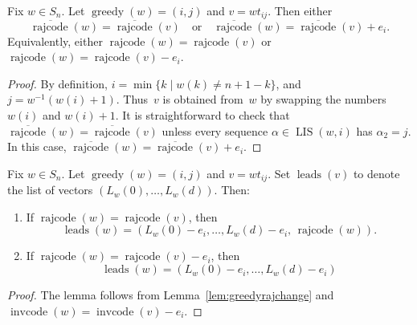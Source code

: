 \documentclass[ALCO]{cedram}
\DeclareMathOperator{\greedy}{\mathrm{greedy}}
\DeclareMathOperator{\leads}{\mathrm{leads}}
\DeclareMathOperator{\LIS}{\mathrm{LIS}}
\DeclareMathOperator{\cc}{\mathrm{invcode}}
\DeclareMathOperator{\rr}{\mathrm{rajcode}}
\newcommand{\orr}{\overline{\rr}}
\begin{document}
\begin{lemma}
	\label{lem:greedyrajchange}
	Fix $w\in S_n$. Let $\greedy(w)=(i,j)$ and $v=wt_{ij}$. Then either
	\[\orr(w) = \orr(v) \quad\mbox{or}\quad \orr(w) = \orr(v)+e_i.\]
	Equivalently, either $\rr(w) = \rr(v)$ or $\rr(w) = \rr(v)-e_i$.
\end{lemma}
\begin{proof}
	By definition, $i=\min\{k\mid w(k)\neq n+1-k\}$, and $j=w^{-1}(w(i)+1)$. Thus~$v$ is obtained from~$w$ by swapping the numbers $w(i)$ and $w(i)+1$. It is straightforward to check that $\orr(w)=\orr(v)$ unless every sequence $\alpha\in\LIS(w,i)$ has $\alpha_2=j$. In this case, $\orr(w)=\orr(v)+e_i$.
\end{proof}

\begin{lemma}
	\label{lem:greedyleadsjchange}
	Fix $w\in S_n$. Let $\greedy(w)=(i,j)$ and $v=wt_{ij}$. Set $\leads(v)$ to denote the list of vectors $(L_w(0),\ldots,L_w(d))$. Then:
	\begin{enumerate}[label=\textup{(\alph*)}]
		\item If $\rr(w) = \rr(v)$, then 
		\[\leads(w) = (L_w(0)-e_i,\ldots,L_w(d)-e_i,\,\rr(w)).\]
		\item If $\rr(w) = \rr(v)-e_i$, then 
		\[\leads(w) = (L_w(0)-e_i,\ldots,L_w(d)-e_i)\]
	\end{enumerate}
\end{lemma}
\begin{proof}
	The lemma follows from Lemma~\ref{lem:greedyrajchange} and $\cc(w)=\cc(v)-e_i$.	
\end{proof}
\end{document}
